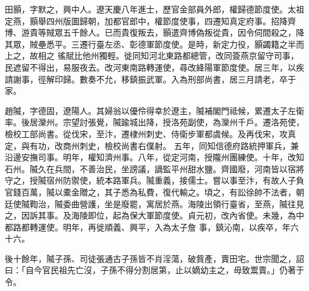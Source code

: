 \begin{pinyinscope}
 田顥，字默之，興中人。遼天慶八年進士，歷官金部員外郎，權歸德節度使。太祖定燕，顥舉四州版圖歸朝，加都官郎中，權節度使事，四遷知真定府事。招降齊博、游貴等賊眾五千餘人。已而貴復叛去，顥遣齊博偽叛從貴，因令伺間殺之，降其眾，賊壘悉平。三遷行臺左丞、彰德軍節度使。是時，新定力役，顥蠲籍之半而上之，故相之
 徭賦比他州獨輕。徙同知河北東路都總管，改同簽燕京留守司事，民遮留不得出，易服夜去。改河東南路轉運使，尋改絳陽軍節度使。居三年，以疾請謝事，徑解印歸。數奏不允，移鎮振武軍。入為刑部尚書，居三月請老，卒于家。



 趙隇，字德固，遼陽人。其婦翁以優伶得幸於遼主，隇補閣門祗候，累遷太子左衛率。後居灤州。宗望討張覺，隇踰城出降，授洛苑副使，為灤州千戶。遷洛苑使，檢校工部尚書。從伐宋，至汴，遷棣州刺史、侍衛步軍都虞候。及再伐宋，攻真定，與有功，改商州刺史，檢校尚書右僕射。
 五年，同知信德府路統押軍兵，兼沿邊安撫司事。明年，權知濟州事。八年，從定河南，授隴州團練使。十年，改知石州。隇久在兵間，不善治民，坐謗議，謫監平州甜水鹽。齊國廢，河南皆以宿將守之，授隇宿州防禦使，統本路軍兵。隇重義，接儒士。嘗以事至汴，有故人子負官錢百萬，隇以橐金贈之，其子悉為私費，復代輸之。頃之，有訟徐帥不法者，朝廷使隇鞫治，隇委曲營護，坐是廢罷，寓居於燕。海陵出領行臺省，至燕，隇往見之，因訴其事。及海陵即位，起為保大軍節度使。貞元初，改內省使。未幾，為中都路都轉運使。明年，再徙順義、興平，入為太子詹
 事，鎮沁南，以疾卒，年六十六。



 後十餘年，隇子孫、司徒張通古子孫皆不肖淫蕩，破貲產，賣田宅。世宗聞之，詔曰：「自今官民祖先亡沒，子孫不得分割居第，止以嫡幼主之，毋致鬻賣。」仍著于令。



\end{pinyinscope}